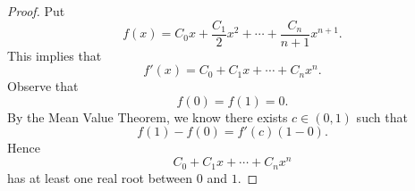 \begin{Exercise}
	\begin{proof}
		Put
		$$
		f(x) = C_0 x + \frac{C_1}{2} x^2 + \cdots + \frac{C_n}{n+1} x^{n+1}.
		$$
		This implies that
		$$
		f'(x) = C_0 + C_1 x + \cdots + C_n x^n.
		$$
		Observe that
		$$
		f(0) = f(1) = 0.
		$$
		By the Mean Value Theorem, we know there exists $c\in(0,1)$ such that
		$$
		f(1) - f(0) = f'(c) (1-0).
		$$
		Hence 
		$$
		C_0 + C_1 x + \cdots + C_n x^n
		$$
		has at least one real root between $0$ and $1$.
	\end{proof}
\end{Exercise}